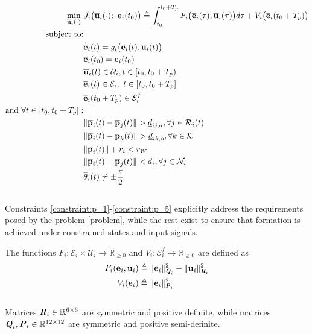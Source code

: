 \begin{align}
  \min\limits_{\overline{\bm{\mathbf{u}}}_i (\cdot)}\ &
    J_i \big(\overline{\bm{\mathbf{u}}}_i (\cdot);\ \bm{\mathbf{e}}_i(t_0)\big) \triangleq
      \int_{t_0}^{t_0 + T_p} F_i \big(\overline{\bm{\mathbf{e}}}_i(\tau), \overline{\bm{\mathbf{u}}}_i (\tau)\big) d \tau +
      V_i \big(\overline{\bm{\mathbf{e}}}_i (t_0 + T_p)\big) \label{position_based_cost} \\
  \text{subject to:} & \nonumber \\
  & \dot{\overline{\bm{\mathbf{e}}}}_i(t) = g_i \big(\overline{\bm{\mathbf{e}}}_i (t), \overline{\bm{\mathbf{u}}}_i (t)\big) \\
  & \overline{\bm{\mathbf{e}}}_i (t_0) = \bm{\mathbf{e}}_i (t_0) \\
  & \overline{\bm{\mathbf{u}}}_i(t) \in \mathcal{U}_i, t \in [t_0, t_0 + T_p)\\
  & \overline{\bm{\mathbf{e}}}_i (t) \in \mathcal{E}_i,\ t \in [t_0, t_0 + T_p]\\
  & \overline{\bm{\mathbf{e}}}_i (t_0 + T_p) \in \mathcal{E}_i^f \\
  \text{and } \forall t \in [t_0, t_0 + T_p]:& \nonumber \\
  & \|\overline{\bm{\mathbf{p}}}_i(t) - \overline{\bm{\mathbf{p}}}_j(t)\| > \underline{d}_{ij,a}, \forall j \in \mathcal{R}_i(t) \label{constraint:p_1}\\
  & \|\overline{\bm{\mathbf{p}}}_i(t) - \bm{\mathbf{p}}_k(t)\| > \underline{d}_{ik,o}, \forall k \in \mathcal{K} \\
  & \|\overline{\bm{\mathbf{p}}}_i(t)\| + r_i < r_W \\
  & \|\overline{\bm{\mathbf{p}}}_i(t) - \overline{\bm{\mathbf{p}}}_j(t)\| < d_i, \forall j \in \mathcal{N}_i \\
  & \overline{\theta}_i(t) \ne \pm \frac{\pi}{2} \label{constraint:p_5}
\end{align}\\
Constraints \ref{constraint:p_1}-\ref{constraint:p_5} explicitly address the
requirements posed by the problem \eqref{problem}, while the rest exist to
ensure that formation is achieved under constrained states and input signals.

The functions
$F_i : \mathcal{E}_i \times \mathcal{U}_i \to \mathbb{R}_{\geq 0}$ and
$V_i: \mathcal{E}_i^f \to \mathbb{R}_{\geq 0}$ are defined as
\begin{align}
  F_i (\bm{\mathbf{e}}_i, \bm{\mathbf{u}}_i)
    &\triangleq \| \bm{\mathbf{e}}_i\|_{\bm{\mathit{Q}}_i}^2 + \| \bm{\mathbf{u}}_i\|_{\bm{\mathit{R}}_i}^2 \\
  V_i (\bm{\mathbf{e}}_i)
    & \triangleq \| \bm{\mathbf{e}}_i \|_{\bm{\mathit{P}}_i}^2
\end{align}\\
Matrices $\bm{\mathit{R}}_i \in \mathbb{R}^{6 \times 6}$ are symmetric and positive
definite, while matrices $\bm{\mathit{Q}}_i, \bm{\mathit{P}}_i \in \mathbb{R}^{12 \times 12}$
are symmetric and positive semi-definite.

